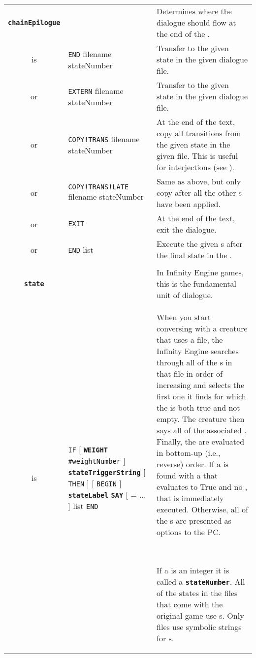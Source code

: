 \documentclass{article}
\def\ttref#1{\ahrefloc{#1}{\tt #1}}
\def\DEFINE#1{{\tt \bf #1}\label{#1}\index{#1}}
\def\t#1{{\tt #1}}
\def\Slist{{\color{red} list }}
\def\Ob{{\color{red} [ }}
\def\Oe{{\color{red} ] }}
\begin{document}
\begin{tabular}{cp{10in}|p{10in}}
\\

\DEFINE{chainEpilogue} & & Determines where the dialogue should flow at the
end of the \ttref{CHAIN}. \\
is & {\tt END} filename stateNumber & Transfer to the given state in the given dialogue file. \\
or & {\tt EXTERN} filename stateNumber & Transfer to the given state in the given dialogue file. \\
or & {\tt COPY!TRANS} filename stateNumber & At the end of the
\ttref{CHAIN} text, copy all transitions from the given state in the
given file. This is useful for interjections (see \ttref{INTERJECT}).  \\
or & {\tt COPY!TRANS!LATE} filename stateNumber & Same as above, but only copy after all the other \ttref{D Action}s have been applied. \\
or & {\tt EXIT} & At the end of the \ttref{CHAIN} text, exit the dialogue.\\
or & {\tt END} \ttref{transition} \Slist & Execute the given \ttref{transition}s
after the final state in the \ttref{CHAIN}. \\

\\

\DEFINE{state} & & In Infinity Engine games, this is the fundamental unit
of dialogue. \\
is & {\tt IF} \Ob \DEFINE{WEIGHT} \t{\#weightNumber} \Oe \DEFINE{stateTriggerString} \Ob {\tt THEN} \Oe
  \Ob {\tt BEGIN} \Oe \DEFINE{stateLabel} \DEFINE{SAY} \ttref{sayText} \Ob =
  \ttref{sayText} ... \Oe \ttref{transition} \Slist \t{END} & 
  When you start conversing with a creature that uses a \ttref{DLG} file, the
  Infinity Engine searches through all of the \ttref{state}s in that file
  in order of increasing \ttref{WEIGHT} and selects the first one it finds
  for which the \ttref{stateTriggerString} is both true and not empty. 
  The creature then says all of the associated \ttref{sayText}. Finally,
  the \ttref{transitions} are evaluated in bottom-up (i.e., reverse) order.
  If a \ttref{transition} is found with a \ttref{transTriggerString} that
  evaluates to True and no \ttref{replyText}, that \ttref{transition} is
  immediately executed. Otherwise, all of the \ttref{transition}s are
  presented as options to the PC. 

  \ 

  If a \ttref{stateLabel} is an integer it is called a
  \DEFINE{stateNumber}. All of the states in the \ttref{DLG} files that
  come with the original game use \ttref{stateNumber}s. Only \ttref{D}
  files use symbolic strings for \ttref{stateLabel}s. 
  

\end{tabular}
\end{document}
